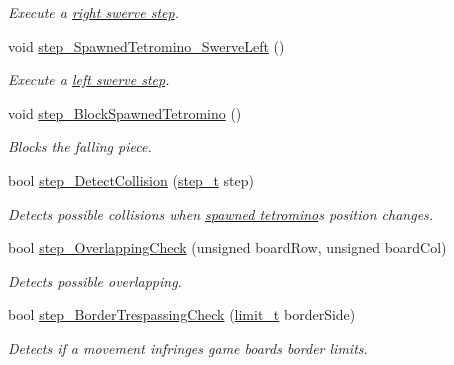 \begin{DoxyCompactItemize}
\begin{DoxyCompactList}\small\item\em Execute a \hyperlink{TetreesDefs_8hpp_a4d5a793092a473f85b4c1f7faf62afeda86fdea6e730f10b7d265b067552624d3}{right swerve step}. \end{DoxyCompactList}\item 
void \hyperlink{classTetreesEngine_ab7169a28a06a867ada69a01a580fb2ad}{step\+\_\+\+Spawned\+Tetromino\+\_\+\+Swerve\+Left} ()
\begin{DoxyCompactList}\small\item\em Execute a \hyperlink{TetreesDefs_8hpp_a4d5a793092a473f85b4c1f7faf62afeda3b27946656fc3bf9470a8b7761cfa8e1}{left swerve step}. \end{DoxyCompactList}\item 
void \hyperlink{classTetreesEngine_a0978ef1f287f00a8ed5a4af2d680b943}{step\+\_\+\+Block\+Spawned\+Tetromino} ()
\begin{DoxyCompactList}\small\item\em Blocks the falling piece. \end{DoxyCompactList}\item 
bool \hyperlink{classTetreesEngine_a25f8b896240ce2d2a34b1d968e75b5b6}{step\+\_\+\+Detect\+Collision} (\hyperlink{TetreesDefs_8hpp_a4d5a793092a473f85b4c1f7faf62afed}{step\+\_\+t} step)
\begin{DoxyCompactList}\small\item\em Detects possible collisions when \hyperlink{classTetreesEngine_a26435ee2f02d9ba70d9e359745114f6e}{spawned tetromino}\textquotesingle{}s position changes. \end{DoxyCompactList}\item 
bool \hyperlink{classTetreesEngine_a270b227c9dfbfb72513c6cdfdd910d1b}{step\+\_\+\+Overlapping\+Check} (unsigned board\+Row, unsigned board\+Col)
\begin{DoxyCompactList}\small\item\em Detects possible overlapping. \end{DoxyCompactList}\item 
bool \hyperlink{classTetreesEngine_aa593f5f688e984a2cdbbf83b162d00a2}{step\+\_\+\+Border\+Trespassing\+Check} (\hyperlink{TetreesDefs_8hpp_a5dbb1ebfe8a9b95707ac161d3549ed8a}{limit\+\_\+t} border\+Side)
\begin{DoxyCompactList}\small\item\em Detects if a movement infringes game board\textquotesingle{}s border limits. \end{DoxyCompactList}\item 

\end{DoxyCompactItemize}
